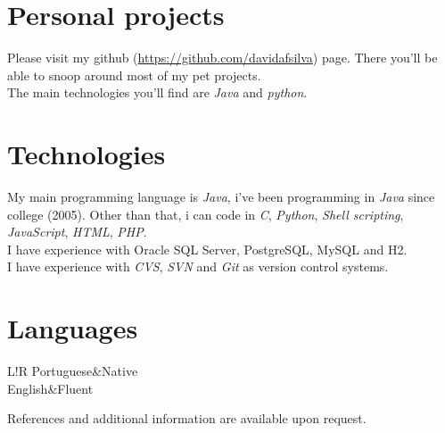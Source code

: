 \documentclass[10pt]{article}
\newcommand\VRule{\color{lightgray}\vrule width 0.5pt}
\begin{document}
\section*{Personal projects}
Please visit my github (\url{https://github.com/davidafsilva}) page. There you'll be able to snoop around most of my pet projects.\\
The main technologies you'll find are \emph{Java} and \emph{python}.

\section*{Technologies}
My main programming language is \emph{Java}, i've been programming in \emph{Java} since college (2005). Other than that, i can code in \emph{C}, \emph{Python}, \emph{Shell scripting}, \emph{JavaScript}, \emph{HTML}, \emph{PHP}.\\
I have experience with Oracle SQL Server, PostgreSQL, MySQL and H2.\\
I have experience with \emph{CVS}, \emph{SVN} and \emph{Git} as version control systems.

\section*{Languages}
\begin{tabular}{L!{\VRule}R}
Portuguese&Native\\
English&Fluent\\
\end{tabular}
{\vspace{20pt}\newline\newline
\vspace{20pt}
\scriptsize\hfill References and additional information are available upon request.}
\end{document}

